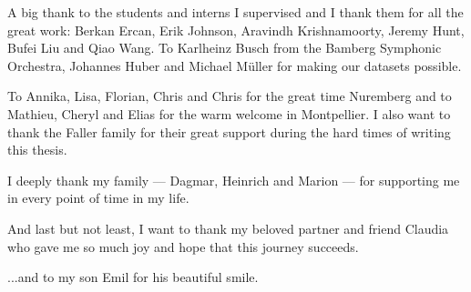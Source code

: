 A big thank to the students and interns I supervised and I thank them for all the great work: Berkan Ercan, Erik Johnson, Aravindh Krishnamoorty, Jeremy Hunt, Bufei Liu and Qiao Wang. 
To Karlheinz Busch from the Bamberg Symphonic Orchestra, Johannes Huber and Michael Müller for making our datasets possible. 

\bigskip

To Annika, Lisa, Florian, Chris and Chris for the great time Nuremberg and to Mathieu, Cheryl and Elias for the warm welcome in Montpellier.
I also want to thank the Faller family for their great support during the hard times of writing this thesis.

\bigskip

I deeply thank my family --- Dagmar, Heinrich and Marion --- for supporting me in every point of time in my life.

\bigskip

And last but not least, I want to thank my beloved partner and friend Claudia who gave me so much joy and hope that this journey succeeds.

\bigskip

...and to my son Emil for his beautiful smile.

\endgroup

